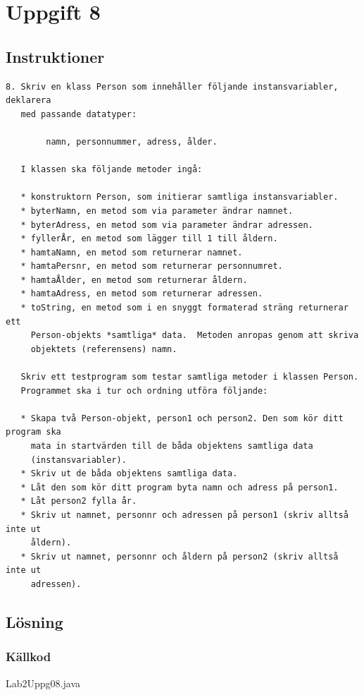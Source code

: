\section{Uppgift 8}\label{sec:uppg08}

\subsection{Instruktioner}
\begin{verbatim}
8. Skriv en klass Person som innehåller följande instansvariabler, deklarera
   med passande datatyper:

        namn, personnummer, adress, ålder.

   I klassen ska följande metoder ingå:

   * konstruktorn Person, som initierar samtliga instansvariabler.
   * byterNamn, en metod som via parameter ändrar namnet.
   * byterAdress, en metod som via parameter ändrar adressen.
   * fyllerÅr, en metod som lägger till 1 till åldern.
   * hamtaNamn, en metod som returnerar namnet.
   * hamtaPersnr, en metod som returnerar personnumret.
   * hamtaÅlder, en metod som returnerar åldern.
   * hamtaAdress, en metod som returnerar adressen.
   * toString, en metod som i en snyggt formaterad sträng returnerar ett
     Person-objekts *samtliga* data.  Metoden anropas genom att skriva
     objektets (referensens) namn.

   Skriv ett testprogram som testar samtliga metoder i klassen Person.
   Programmet ska i tur och ordning utföra följande:

   * Skapa två Person-objekt, person1 och person2. Den som kör ditt program ska
     mata in startvärden till de båda objektens samtliga data
     (instansvariabler).
   * Skriv ut de båda objektens samtliga data.
   * Låt den som kör ditt program byta namn och adress på person1.
   * Låt person2 fylla år.
   * Skriv ut namnet, personnr och adressen på person1 (skriv alltså inte ut
     åldern).
   * Skriv ut namnet, personnr och åldern på person2 (skriv alltså inte ut
     adressen).
\end{verbatim}


\subsection{Lösning}

\subsubsection{Källkod}
\caption{Lab2Uppg08.java}
\label{src:uppg08}

